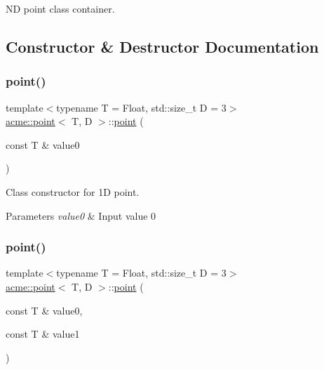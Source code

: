 ND point class container. 

\subsection{Constructor \& Destructor Documentation}
\mbox{\label{classacme_1_1point_ae1877073e915c45fba6ad5bbefc37f11}} 
\subsubsection{\texorpdfstring{point()}{point()}\hspace{0.1cm}{\footnotesize\ttfamily [1/4]}}
{\footnotesize\ttfamily template$<$typename T = Float, std\+::size\+\_\+t D = 3$>$ \\
\hyperlink{classacme_1_1point}{acme\+::point}$<$ T, D $>$\+::\hyperlink{classacme_1_1point}{point} (\begin{DoxyParamCaption}\item[{const T \&}]{value0 }\end{DoxyParamCaption})\hspace{0.3cm}{\ttfamily [inline]}}



Class constructor for 1D point. 


\begin{DoxyParams}{Parameters}
{\em value0} & Input value 0 \\
\hline
\end{DoxyParams}
\mbox{\label{classacme_1_1point_a83633e83dfae312248d0a01fc9291f2a}} 
\subsubsection{\texorpdfstring{point()}{point()}\hspace{0.1cm}{\footnotesize\ttfamily [2/4]}}
{\footnotesize\ttfamily template$<$typename T = Float, std\+::size\+\_\+t D = 3$>$ \\
\hyperlink{classacme_1_1point}{acme\+::point}$<$ T, D $>$\+::\hyperlink{classacme_1_1point}{point} (\begin{DoxyParamCaption}\item[{const T \&}]{value0,  }\item[{const T \&}]{value1 }\end{DoxyParamCaption})\hspace{0.3cm}{\ttfamily [inline]}}



